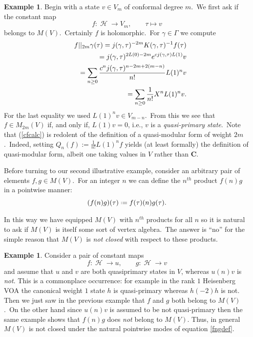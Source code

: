 \documentclass[12pt]{amsart}
\theoremstyle{plain}
\theoremstyle{definition}
\newtheorem{ex}[thm]{Example}
\theoremstyle{remark}
\DeclareMathOperator{\uhp}{\mathcal{H}}
\newcommand*{\df}{\mathrel{\vcenter{\baselineskip0.5ex \lineskiplimit0pt
                     \hbox{\scriptsize.}\hbox{\scriptsize.}}} =}
\newcommand{\CC}{\mathbf{C}}
\begin{document}
\begin{ex}
\label{ex:constantsection}
Begin with a state $v\in V_m$ of conformal degree $m$.\ We first ask if the constant map
$$f:\uhp\rightarrow V_m,\quad\quad \tau\mapsto v$$
belongs to $M(V)$.\ Certainly $f$ is  holomorphic.\ For $\gamma\in\Gamma$ we compute
\begin{eqnarray}\label{cfcalc}
 &&f||_{2m}\gamma(\tau) = j(\gamma, \tau)^{-2m}K(\gamma, \tau)^{-1}f(\tau) \notag  \\
 &&=j(\gamma, \tau)^{2L(0)-2m}e^{cj(\gamma, \tau)L(1)}v  \notag \\
 &&=\sum_{n\geq0} \frac{c^nj(\gamma, \tau)^{n-2m+2(m-n)}}{n!} L(1)^nv  \notag \\
 &&=\sum_{n\geq0} \frac{1}{n!} X^n L(1)^nv.
\end{eqnarray}
For the last equality we used $L(1)^nv\in V_{m-n}$.\
From this we see that $f\in M_{2m}(V)$
if, and only if, $L(1)v=0$, i.e., $v$ is a \textit{quasi-primary state}.\ Note that (\ref{cfcalc}) is redolent of the definition of a quasi-modular form of weight $2m$.\ Indeed, setting $Q_n(f):=\frac{1}{n!} L(1)^nf$ yields
(at least formally) the definition of quasi-modular form, albeit one taking values in $V$ rather than $\CC$.
\end{ex}

Before turning to our second
 illustrative example, consider an arbitrary pair
 of elements $f, g\in M(V)$.\ For an integer $n$ we can define the $n^{th}$ product $f(n)g$ in a pointwise manner: 
 \begin{equation}
 \label{fngdef}
 (f(n)g)(\tau)\df f(\tau)(n)g(\tau).    
 \end{equation}
 
In this way we have equipped $M(V)$
with $n^{th}$ products for all $n$ so it is natural to ask if $M(V)$ is itself some sort of vertex algebra.\ The answer is ``no'' for the simple reason that $M(V)$ is \emph{not closed} with respect to these products.\ 

\begin{ex}
Consider a pair of constant maps
$$f:\uhp\rightarrow  u, \quad\quad g:\uhp\rightarrow v$$
and assume that $u$ and $v$ are both quasiprimary states in $V$, whereas $u(n)v$ is \emph{not}. This is a commonplace occurrence: for example in the rank $1$ Heisenberg VOA the canonical weight $1$ state $h$ is quasi-primary whereas $h(-2)h$ is not. Then we just saw in the previous example that $f$ and $g$ both belong to $M(V)$.\ On the other hand since $u(n)v$ is assumed to be not quasi-primary then the same example shows that $f(n)g$ does \emph{not} belong to $M(V)$. Thus, in general $M(V)$ is not closed under the natural pointwise modes of equation \eqref{fngdef}.
\end{ex}
\end{document}
